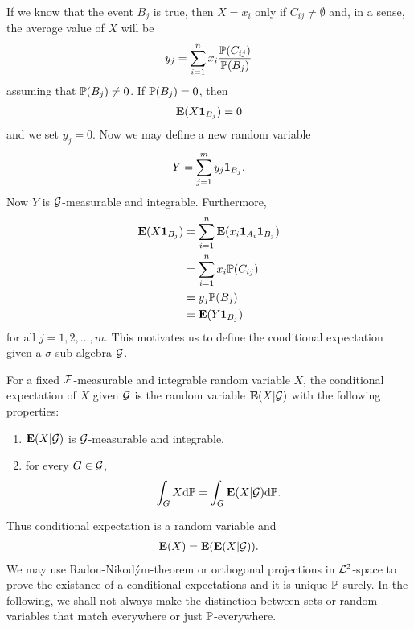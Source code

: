If we know that the event $B_j$ is true, then $X = x_i$ only if $C_{ij} \not = \emptyset$ and, in a sense, the average value of $X$ will be
  \begin{align}
    y_j = \sum_{i=1}^n x_i \frac{\mathbb{P}( C_{ij} )}{ \mathbb{P}( B_j ) }
  \end{align}
assuming that $\mathbb{P} (B_j ) \not = 0$. If $\mathbb{P} (B_j ) = 0$, then
  \begin{align}
    \operatorname{\boldsymbol{\mathrm{E}}} (X \boldsymbol{1}_{B_j} ) = 0
  \end{align}
and we set $y_j = 0$. Now we may define a new random variable
  \begin{align}
    Y = \sum_{j=1}^m y_j \boldsymbol{1}_{B_j} .
  \end{align}
Now $Y$ is $\mathcal{G}$-measurable and integrable. Furthermore,
  \begin{align}
    \operatorname{\boldsymbol{\mathrm{E}}} (X \boldsymbol{1}_{B_j} ) &= \sum_{i=1}^n \operatorname{\boldsymbol{\mathrm{E}}} ( x_i \boldsymbol{1}_{A_i} \boldsymbol{1}_{B_j} ) \\
      &= \sum_{i=1}^n x_i \mathbb{P} ( C_{ij} ) \\
      &= y_j \mathbb{P} ( B_j ) \\
      &= \operatorname{\boldsymbol{\mathrm{E}}} (Y \boldsymbol{1}_{B_j} )
  \end{align}
for all $j = 1,2, \ldots, m$. This motivates us to define the conditional expectation given a $\sigma$-sub-algebra $\mathcal{G}$.

For a fixed $\mathcal{F}$-measurable and integrable random variable $X$, the conditional expectation of $X$ given $\mathcal{G}$ is the random variable $\operatorname{\boldsymbol{\mathrm{E}}} (X | \mathcal{G})$ with the following properties:
  \begin{enumerate}[label=\roman*)]
    \item $\operatorname{\boldsymbol{\mathrm{E}}} (X | \mathcal{G})$ is $\mathcal{G}$-measurable and integrable,
    \item for every $G \in \mathcal{G}$,
      \begin{align}
        \label{conditionalsecondcond}
        \int_G X \mathrm{d} \mathbb{P} = \int_G \operatorname{\boldsymbol{\mathrm{E}}} (X | \mathcal{G}) \mathrm{d} \mathbb{P}.
      \end{align}
  \end{enumerate}
  
Thus conditional expectation is a random variable and 
\begin{align}
	\operatorname{\boldsymbol{\mathrm{E}}} (X) = \operatorname{\boldsymbol{\mathrm{E}}} (\operatorname{\boldsymbol{\mathrm{E}}} (X | \mathcal{G})).
\end{align} 
We may use Radon-Nikod\'{y}m-theorem or orthogonal projections in $\mathcal{L}^2$-space to prove the existance of a conditional expectations and it is unique $\mathbb{P}$-surely. In the following, we shall not always make the distinction between sets or random variables that match everywhere or just $\mathbb{P}$-everywhere. 

